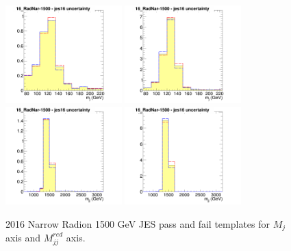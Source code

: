 \begin{figure}[!htb]
	\centering
	\includegraphics[width=0.4\textwidth]{Figures/Uncertainty_16_RadNar-1500_jes16failX.png}
	\includegraphics[width=0.4\textwidth]{Figures/Uncertainty_16_RadNar-1500_jes16passX.png}
	\includegraphics[width=0.4\textwidth]{Figures/Uncertainty_16_RadNar-1500_jes16failY.png}
	\includegraphics[width=0.4\textwidth]{Figures/Uncertainty_16_RadNar-1500_jes16passY.png}
	\caption{2016 Narrow Radion 1500 GeV JES pass and fail templates for $M_j$ axis and $M_{jj}^{red}$ axis.}
	\label{fig:jesRadion2}
\end{figure}
